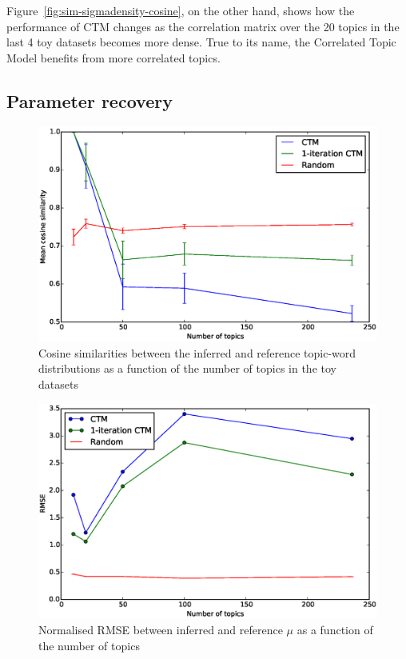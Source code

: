 \documentclass[12pt,a4paper,twoside,openright]{report}
\begin{document}
Figure~\ref{fig:sim-sigmadensity-cosine}, on the other hand, shows how the performance of CTM changes as the correlation matrix over the 20 topics in the last 4 toy datasets becomes more dense. True to its name, the Correlated Topic Model benefits from more correlated topics.

\subsection{Parameter recovery}

\begin{figure}[!htb]
\includegraphics[width=\textwidth]{sim-beta-cosine.eps}
\caption{Cosine similarities between the inferred and reference topic-word distributions as a function of the number of topics in the toy datasets}
\label{fig:sim-beta-cosine}
\end{figure}

\begin{figure}[!htb]
\includegraphics[width=\textwidth]{sim-mu-rmse.eps}
\caption{Normalised RMSE between inferred and reference $\mu$ as a function of the number of topics}
\label{fig:sim-mu-rmse}
\end{figure}
\end{document}
